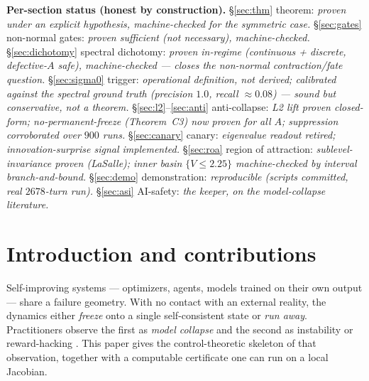 \documentclass[11pt]{article}
\theoremstyle{definition}
\begin{document}
\begin{caveatbox}
\textbf{Per-section status (honest by construction).}
\S\ref{sec:thm} theorem: \emph{proven under an explicit hypothesis, machine-checked for
the symmetric case.}
\S\ref{sec:gates} non-normal gates: \emph{proven sufficient (not necessary), machine-checked.}
\S\ref{sec:dichotomy} spectral dichotomy: \emph{proven in-regime (continuous + discrete,
defective-$A$ safe), machine-checked --- closes the non-normal contraction/fate question.}
\S\ref{sec:sigma0} trigger: \emph{operational definition, not derived; calibrated against the
spectral ground truth (precision $1.0$, recall $\approx0.08$) --- sound but conservative, not a theorem.}
\S\ref{sec:l2}--\ref{sec:anti} anti-collapse: \emph{L2 lift proven closed-form; no-permanent-freeze
(Theorem~C3) now proven for all $A$; suppression corroborated over $900$ runs.}
\S\ref{sec:canary} canary: \emph{eigenvalue readout retired; innovation-surprise signal
implemented.}
\S\ref{sec:roa} region of attraction: \emph{sublevel-invariance proven (LaSalle); inner basin
$\{V\le2.25\}$ machine-checked by interval branch-and-bound.}
\S\ref{sec:demo} demonstration: \emph{reproducible (scripts committed, real $2678$-turn run).}
\S\ref{sec:asi} AI-safety: \emph{the keeper, on the model-collapse literature.}
\end{caveatbox}

\tableofcontents
\bigskip

\section{Introduction and contributions}
\label{sec:intro}
Self-improving systems --- optimizers, agents, models trained on their own output ---
share a failure geometry. With no contact with an external reality, the dynamics either
\emph{freeze} onto a single self-consistent state or \emph{run away}. Practitioners
observe the first as \emph{model collapse} \cite{shumailov2024,dohmatob2024,feng2024} and
the second as instability or reward-hacking \cite{amodei2016,skalse2022}. This paper gives
the control-theoretic skeleton of that observation, together with a computable certificate
one can run on a local Jacobian.
\end{document}
